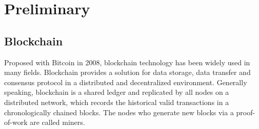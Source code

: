 \documentclass[conference]{IEEEtran}
\begin{document}
%
%
%
%
%
%
%
%
%
%	
%	
%	
%	
%	
%	
%	

\section{Preliminary}

	\subsection{Blockchain}
	Proposed with Bitcoin \cite{nakamoto2008bitcoin} in 2008, blockchain technology has been widely used in many fields. Blockchain provides a solution for data storage, data transfer and consensus protocol in a distributed and decentralized environment. Generally speaking, blockchain is a shared ledger and replicated by all nodes on a distributed network, which records the historical valid transactions in a chronologically chained blocks. The nodes who generate new blocks via a proof-of-work are called miners.
	
\end{document}
